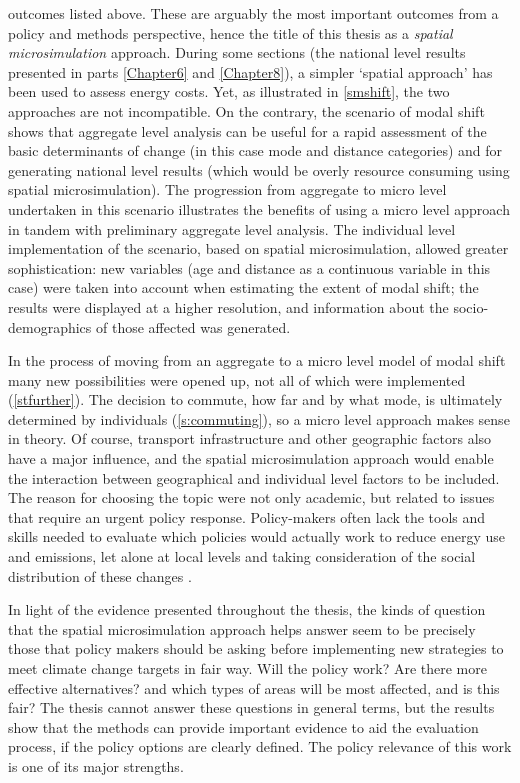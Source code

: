 \documentclass[a4paper, 11pt, twoside]{Thesis}
\begin{document}
outcomes listed above. These are arguably the most important outcomes
from a policy and methods perspective, hence the title of this thesis as a
\emph{spatial microsimulation} approach. During some sections (the
national level results presented in parts \cref{Chapter6} and \cref{Chapter8}),
a simpler `spatial approach' has been used to assess energy costs.
Yet, as illustrated in \cref{smshift}, the two approaches are not incompatible.
On the contrary, the scenario of modal shift shows that aggregate level
analysis can be useful for a rapid assessment of the basic determinants of
change (in this case mode and distance categories) and for generating
national level results (which would be overly resource consuming
using spatial microsimulation). The progression from aggregate to micro level
undertaken in this scenario illustrates the benefits of using a micro level
approach in tandem with preliminary aggregate level analysis.
The individual level implementation of the scenario, based on spatial microsimulation,
allowed greater sophistication: new variables
(age and distance as a continuous variable in this case)
were taken into account when estimating the extent of modal shift;
the results were displayed at a higher resolution,
and information about the socio-demographics of those affected was generated.

In the process of moving from an aggregate to a micro level model of
modal shift many new possibilities were opened up, not
all of which were implemented (\cref{stfurther}). The decision to commute,
how far and by what mode, is ultimately determined
by individuals (\cref{s:commuting}), so a micro level approach makes sense in theory.
Of course, transport infrastructure and other geographic factors also have a major
influence, and the spatial microsimulation approach would enable the interaction
between geographical and individual level factors to be included.
The reason for choosing the topic
were not only academic, but related to issues that
require an urgent policy response. Policy-makers often lack the tools and skills needed to
evaluate which policies would actually work to reduce energy
use and emissions, let alone at local levels and taking consideration
of the social distribution of these changes \citep{Banister2008, Tribby2012}.

In light of the evidence presented throughout the thesis, the kinds of question that
the spatial microsimulation approach helps answer
seem to be precisely those that policy makers should be asking before implementing new
strategies to meet climate change targets in fair way. Will the policy work?
Are there more effective alternatives? and which types of areas will be most
affected, and is this fair? The thesis cannot answer these questions in general terms,
but the results show that the 
methods can provide important evidence to aid the evaluation process, if the policy options are
clearly defined. The policy relevance of this work is one of its major strengths.
\end{document}
